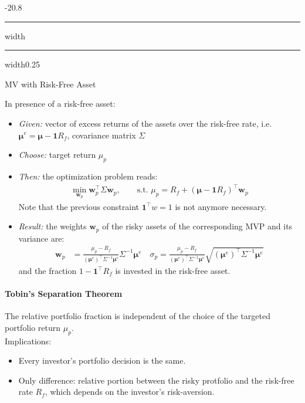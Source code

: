\documentclass[a4paper,landscape,8pt,fleqn]{scrartcl}
\makeatletter
\renewcommand{\subsection}{\@startsection{subsection}{1}{0mm}%
{-2\baselineskip}{0.8\baselineskip}%
{\hrule depth 0.2pt width\columnwidth\hrule depth0.75pt
width0.25\columnwidth\vspace*{1.2em}\large\bfseries}}
\makeatother
\begin{document}
\begin{multicols*}{3}
\subsection{MV with Risk-Free Asset}

In presence of a risk-free asset:
\begin{itemize}
\item \textit{Given:} vector of excess returns of the assets over the risk-free rate, i.e. $\bm \mu^e = \bm \mu - \bm 1 R_f$, covariance matrix $\Sigma$
\item \textit{Choose:} target return $\mu_p$
\item \textit{Then:} the optimization problem reads:
\begin{align*}
\min_{\bm w_p} \bm w_p^\top \Sigma \bm w_p, \qquad \text{s.t. } \mu_p = R_f + (\bm \mu - \bm 1 R_f)^\top \bm w_p
\end{align*}
Note that the previous constraint $\bm 1^\top w = 1$ is not anymore necessary.
\item \textit{Result:} the weights $\bm w_p$ of the risky assets of the corresponding MVP and its variance are:
\begin{align*}
\bm w_p &= \frac{\mu_p - R_f}{(\bm \mu^e)^\top \Sigma^{-1} \bm \mu^e} \Sigma^{-1} \bm \mu^e \quad
\sigma_p = \frac{\mu_p - R_f}{(\bm \mu^e)^\top \Sigma^{-1} \bm \mu^e} \sqrt{(\bm \mu^e)^\top \Sigma^{-1} \bm \mu^e}
\end{align*}
and the fraction $1 - \bm 1^\top R_f$ is invested in the risk-free asset.
\end{itemize}

\paragraph{Tobin's Separation Theorem}
The relative portfolio fraction is independent of the choice of the targeted portfolio return $\mu_p$. \\
Implications:
\begin{itemize}
\item Every investor's portfolio decision is the same.
\item Only difference: relative portion between the risky protfolio and the risk-free rate $R_f$, which depends on the investor's risk-aversion.
\end{itemize}


\end{multicols*}
\end{document}
